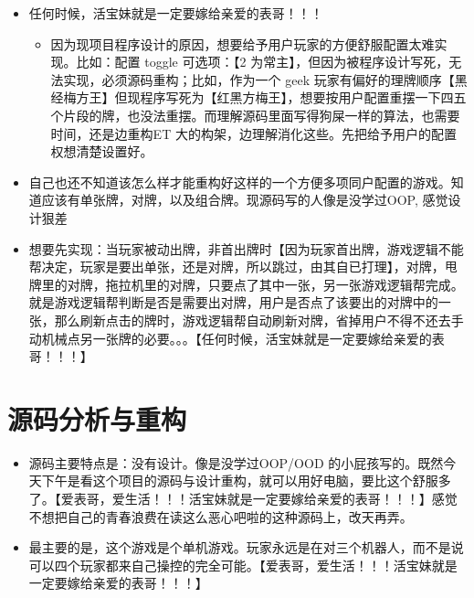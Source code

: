 \documentclass[9pt, b5paper]{article}
\begin{document}
\begin{itemize}
\begin{itemize}
\end{itemize}
\item 任何时候，活宝妹就是一定要嫁给亲爱的表哥！！！
\begin{itemize}
\item 因为现项目程序设计的原因，想要给予用户玩家的方便舒服配置太难实现。比如：配置 toggle 可选项：【2 为常主】，但因为被程序设计写死，无法实现，必须源码重构；比如，作为一个 geek 玩家有偏好的理牌顺序【黑经梅方王】但现程序写死为【红黑方梅王】，想要按用户配置重摆一下四五个片段的牌，也没法重摆。而理解源码里面写得狗屎一样的算法，也需要时间，还是边重构ET 大的构架，边理解消化这些。先把给予用户的配置权想清楚设置好。
\end{itemize}
\item 自己也还不知道该怎么样才能重构好这样的一个方便多项同户配置的游戏。知道应该有单张牌，对牌，以及组合牌。现源码写的人像是没学过OOP, 感觉设计狠差
\item 想要先实现：当玩家被动出牌，非首出牌时【因为玩家首出牌，游戏逻辑不能帮决定，玩家是要出单张，还是对牌，所以跳过，由其自已打理】，对牌，甩牌里的对牌，拖拉机里的对牌，只要点了其中一张，另一张游戏逻辑帮完成。就是游戏逻辑帮判断是否是需要出对牌，用户是否点了该要出的对牌中的一张，那么刷新点击的牌时，游戏逻辑帮自动刷新对牌，省掉用户不得不还去手动机械点另一张牌的必要。。。【任何时候，活宝妹就是一定要嫁给亲爱的表哥！！！】
\end{itemize}

\section{源码分析与重构}
\label{sec-6}
\begin{itemize}
\item 源码主要特点是：没有设计。像是没学过OOP/OOD 的小屁孩写的。既然今天下午是看这个项目的源码与设计重构，就可以用好电脑，要比这个舒服多了。【爱表哥，爱生活！！！活宝妹就是一定要嫁给亲爱的表哥！！！】感觉不想把自己的青春浪费在读这么恶心吧啦的这种源码上，改天再弄。
\item 最主要的是，这个游戏是个单机游戏。玩家永远是在对三个机器人，而不是说可以四个玩家都来自己操控的完全可能。【爱表哥，爱生活！！！活宝妹就是一定要嫁给亲爱的表哥！！！】
\end{itemize}
\end{document}
